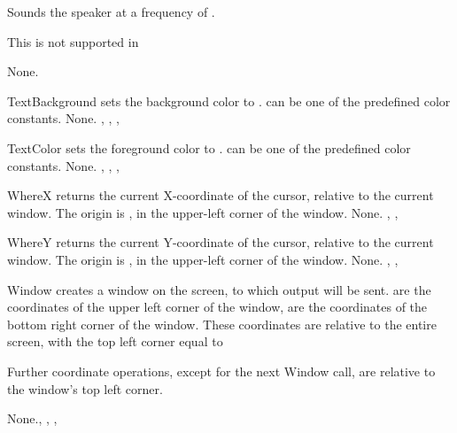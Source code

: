  \html{}


{ Sounds the speaker at a frequency of .

This is not supported in \linux}{None.}{}

{
TextBackground sets the background color to .  can be one of the
predefined color constants.
}
{None.}{ , , ,
}

 \html{}

{
TextColor sets the foreground color to .  can be one of the
predefined color constants.
}
{None.}{ , , ,
}

 \html{}

{
WhereX returns the current X-coordinate of the cursor, relative to the
current window. The origin is , in the upper-left corner of the
window.
}
{None.}{ , ,  }


 \html{}

{
WhereY returns the current Y-coordinate of the cursor, relative to the
current window. The origin is , in the upper-left corner of the
window.
}
{None.}{ , ,  }

 \html{}

{ Window creates a window on the screen, to which output will be sent.
 are the coordinates of the upper left corner of the window,
 are the coordinates of the bottom right corner of the window.
These coordinates are relative to the entire screen, with the top left
corner equal to 

Further coordinate operations, except for the next Window call,
are relative to the window's top left corner.
}
{None.}{, , , }

\html{}



